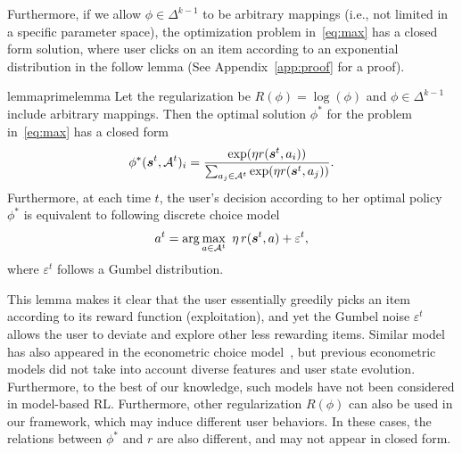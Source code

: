 \documentclass{article} %
\newcommand{\Le}[1]{{\color{red}{\bf\sf [ #1]}}}
\newcommand{\xc}[1]{{\color{blue}{\bf\sf [#1]}}}
\newcommand{\shuang}[1]{{\color{purple}{\bf\sf[ #1]}}}
\newcommand{\Li}[1]{{\color{cyan}{\bf\sf [Li: #1]}}}
\begin{document}






Furthermore, if we allow $\phi \in \Delta^{k-1}$ to be arbitrary mappings (i.e., not limited in a specific parameter space), the optimization problem in~\eqref{eq:max} has a closed form solution, where user clicks on an item according to an exponential distribution in the follow lemma (See Appendix~\ref{app:proof} for a proof).
\begin{restatable}{lemma}{primelemma}\label{lm:lemma1}
Let the regularization be $R(\phi) = \log(\phi)$ and $\phi \in \Delta^{k-1}$ include arbitrary mappings. Then the optimal solution $\phi^*$ for the problem in~\eqref{eq:max} has a closed form
\begin{equation}\label{eq:exp}
	\phi^\ast({\bm{s}}^t,{\mathcal{A}}^t)_i = \dfrac{\exp(\eta r({\bm{s}}^t, a_i))}{\sum_{a_j \in {\mathcal{A}}^t}\exp(\eta r({\bm{s}}^t, a_j))}.
\end{equation}
Furthermore, at each time $t$, the user's decision according to her optimal policy $\phi^*$ is equivalent to \Li{\st{he} the} following discrete choice model
{\small \begin{equation}\label{eq:gumbel}
 	a^t = \arg\max_{a \in {\mathcal{A}}^t }~\eta\, r({\bm{s}}^t, a) + \varepsilon^t,
 \end{equation}}
 where $\varepsilon^t$ follows a Gumbel distribution.
\end{restatable}
This lemma makes it clear that the user essentially greedily picks an item according to its reward function (exploitation), and yet the Gumbel noise $\varepsilon^t$ allows the user to deviate and explore other less rewarding items. Similar model has also appeared in the econometric choice model~\citep{Manski75,McFa73}, but previous econometric models did not take into account diverse features and user state evolution. Furthermore, to the best of our knowledge, such models have not been considered in model-based RL. Furthermore, other regularization $R(\phi)$ can also be used in our framework, which may induce different user behaviors. In these cases, the relations between $\phi^*$ and $r$ are also different, and may not appear in closed form. 
\vspace{-3mm}
\end{document}
